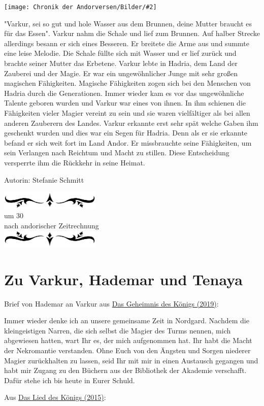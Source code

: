 \documentclass[10pt, a4paper, oneside]{book}
\newcommand{\fillbreak}{\vspace*{\fill}\columnbreak}
\newcommand{\refprodukt}[1]{\hyperref[Produkt: #1]{#1}}
\newcommand{\bildmitts}[2][height=0.32\textwidth,width=0.48\textwidth,keepaspectratio]{%
    \begin{center}
        \texttt{[image: Chronik der Andorversen/Bilder/\#2]}
    \end{center}
}
\newcommand{\az}[1]{%
    \begin{center}
        \includegraphics[width=180px]{Chronik der Andorversen/verzierung1.png}\\
        {\Huge #1} \\
        {nach andorischer Zeitrechnung}\\
        \includegraphics[width=180px]{Chronik der Andorversen/verzierung2.png}
    \end{center}
    \extramarks{}{#1 a.Z.}
}
\begin{document}
\begin{multicols}{2}
\bildmitts{Der Dunkle Magier Varkur Bild 1.jpg}

"Varkur, sei so gut und hole Wasser aus dem Brunnen, deine Mutter braucht es für das Essen". Varkur nahm die Schale und lief zum Brunnen. Auf halber Strecke allerdings besann er sich eines Besseren. Er breitete die Arme aus und summte eine leise Melodie. Die Schale füllte sich mit Wasser und er lief zurück und brachte seiner Mutter das Erbetene. Varkur lebte in Hadria, dem Land der Zauberei und der Magie. Er war ein ungewöhnlicher Junge mit sehr großen magischen Fähigkeiten.  Magische Fähigkeiten zogen sich bei den Menschen von Hadria durch die Generationen. Immer wieder kam es vor das ungewöhnliche Talente geboren wurden und Varkur war eines von ihnen. In ihm schienen die Fähigkeiten vieler Magier vereint zu sein und sie waren vielfältiger als bei allen anderen Zauberern des Landes. Varkur erkannte erst sehr spät welche Gaben ihm geschenkt wurden und dies war ein Segen für Hadria. Denn als er sie erkannte befand er sich weit fort im Land Andor.  Er missbrauchte seine Fähigkeiten, um sein Verlangen nach Reichtum und Macht zu stillen. Diese Entscheidung versperrte ihm die Rückkehr in seine Heimat.\bigskip

Autorin: Stefanie Schmitt






\fillbreak
\az{um 30}
\section{Zu Varkur, Hademar und Tenaya}

\begin{center}
     Brief von Hademar an Varkur  aus \refprodukt{Das Geheimnis des Königs (2019)}:
\end{center}

Immer wieder denke ich an unsere gemeinsame Zeit in Nordgard. Nachdem die kleingeistigen Narren, die sich selbst die Magier des Turms nennen, mich abgewiesen hatten, wart Ihr es, der mich aufgenommen hat. Ihr habt die Macht der Nekromantie verstanden. Ohne Euch von den Ängsten und Sorgen niederer Magier zurückhalten zu lassen, seid Ihr mit mir in einen Austausch gegangen und habt mir Zugang zu den Büchern aus der Bibliothek der Akademie verschafft. Dafür stehe ich bis heute in Eurer Schuld.

\begin{center}
     Aus \refprodukt{Das Lied des Königs (2015)}:
\end{center}


\end{multicols}
\end{document}
